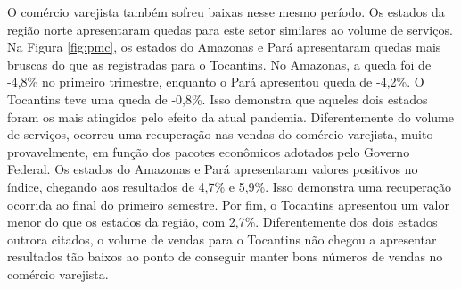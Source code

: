 \par O comércio varejista também sofreu baixas nesse mesmo período. {\color{red}Os estados da região norte} apresentaram quedas para este setor similares ao volume de serviços. Na Figura \ref{fig:pmc}, os estados do Amazonas e Pará apresentaram quedas mais bruscas do que as registradas para o Tocantins. No Amazonas, a queda foi de -4,8\% no primeiro trimestre, enquanto o Pará apresentou queda de -4,2\%. O Tocantins teve uma queda de -0,8\%. Isso demonstra que aqueles dois estados foram os mais atingidos pelo efeito da atual pandemia. Diferentemente do volume de serviços, ocorreu uma recuperação nas vendas do comércio varejista, muito provavelmente, em função dos pacotes econômicos adotados pelo Governo Federal. Os estados do Amazonas e Pará apresentaram valores positivos no índice, chegando aos resultados de 4,7\% e 5,9\%. Isso demonstra uma recuperação ocorrida ao final do primeiro semestre. Por fim, o Tocantins apresentou um valor menor do que os estados da região, com 2,7\%. Diferentemente dos dois estados outrora citados, o volume de vendas para o Tocantins não chegou a apresentar resultados tão baixos ao ponto de conseguir manter bons números de vendas no comércio varejista.
